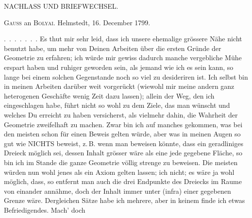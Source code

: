 \begin{center}
{\large NACHLASS UND BRIEFWECHSEL.\par}
\end{center}

\bigskip
\begin{center}\textsc{Gauss} an \textsc{Bolyai}. Helmstedt, 16. December 1799.\end{center}

\medskip
.\, .\, .\, .\, .\, .\, . Es thut mir sehr leid, dass ich unsere ehemalige grössere Nähe nicht benutzt habe, um mehr von Deinen Arbeiten über die ersten Gründe der Geometrie zu erfahren; ich würde mir gewiss dadurch manche vergebliche Mühe erspart haben und ruhiger geworden sein, als jemand wie ich es sein kann, so lange bei einem solchen Gegenstande noch so viel zu desideriren ist. Ich selbst bin in meinen Arbeiten darüber weit vorgerückt (wiewohl mir meine andern ganz heterogenen Geschäfte wenig Zeit dazu lassen); allein der Weg, den ich eingeschlagen habe, führt nicht so wohl zu dem Ziele, das man wünscht und welches Du erreicht zu haben versicherst, als vielmehr dahin, die Wahrheit der Geometrie zweifelhaft zu machen. Zwar bin ich auf manches gekommen, was bei den meisten schon für einen Beweis gelten würde, aber was in meinen Augen so gut wie NICHTS beweist, z.\,B. wenn man beweisen könnte, dass ein geradliniges Dreieck möglich sei, dessen Inhalt grösser wäre als eine jede gegebene Fläche, so bin ich im Stande die ganze Geometrie völlig strenge zu beweisen. Die meisten würden nun wohl jenes als ein Axiom gelten lassen; ich nicht; es wäre ja wohl möglich, dass, so entfernt man auch die drei Endpunkte des Dreiecks im Raume von einander annähme, doch der Inhalt immer unter (infra) einer gegebenen Grenze wäre. Dergleichen Sätze habe ich mehrere, aber in keinem finde ich etwas Befriedigendes. Mach’ doch
